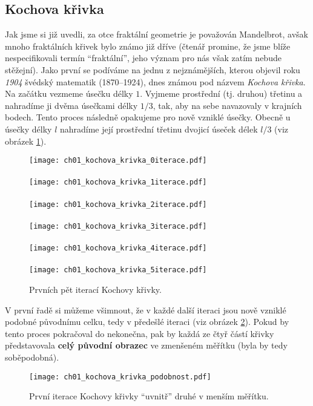 \subsection{Kochova křivka}\label{subsec:kochova_krivka}
Jak jsme si již uvedli, za otce fraktální geometrie je považován Mandelbrot, avšak mnoho fraktálních křivek bylo známo již dříve (čtenář promine, že jsme blíže nespecifikovali termín ``fraktální'', jeho význam pro nás však zatím nebude stěžejní). Jako první se podíváme na jednu z nejznámějších, kterou objevil roku \emph{1904} švédský matematik  \mbox{(1870--1924)}, dnes známou pod názvem \emph{Kochova křivka}. \citep[str. 61]{Peitgen2004} Na začátku vezmeme úsečku délky $1$. Vyjmeme prostřední (tj. druhou) třetinu a nahradíme ji dvěma úsečkami délky $1/3$, tak, aby na sebe navazovaly v krajních bodech. Tento proces následně opakujeme pro nově vzniklé úsečky. Obecně u úsečky délky $l$ nahradíme její prostřední třetinu dvojicí úseček délek $l/3$ (viz obrázek \ref{fig:kochova_vlocka_5iteraci}).
\begin{figure}[h]
    \centering
    \texttt{[image: ch01\_kochova\_krivka\_0iterace.pdf]}\\\qquad\\
    \texttt{[image: ch01\_kochova\_krivka\_1iterace.pdf]}\\\qquad\\
    \texttt{[image: ch01\_kochova\_krivka\_2iterace.pdf]}\\\qquad\\
    \texttt{[image: ch01\_kochova\_krivka\_3iterace.pdf]}\\\qquad\\
    \texttt{[image: ch01\_kochova\_krivka\_4iterace.pdf]}\\\qquad\\
    \texttt{[image: ch01\_kochova\_krivka\_5iterace.pdf]}
    \caption{Prvních pět iterací Kochovy křivky.}
    \label{fig:kochova_vlocka_5iteraci}
\end{figure}
V první řadě si můžeme všimnout, že v každé další iteraci jsou nově vzniklé podobné původnímu celku, tedy v předešlé iteraci (viz obrázek \ref{fig:kochova_krivka_podobnost}). Pokud by tento proces pokračoval do nekonečna, pak by každá ze čtyř částí křivky představovala \textbf{celý původní obrazec} ve zmenšeném měřítku (byla by tedy soběpodobná).
\begin{figure}[h]
    \centering
    \texttt{[image: ch01\_kochova\_krivka\_podobnost.pdf]}
    \caption{První iterace Kochovy křivky ``uvnitř'' druhé v menším měřítku.}
    \label{fig:kochova_krivka_podobnost}
\end{figure}
